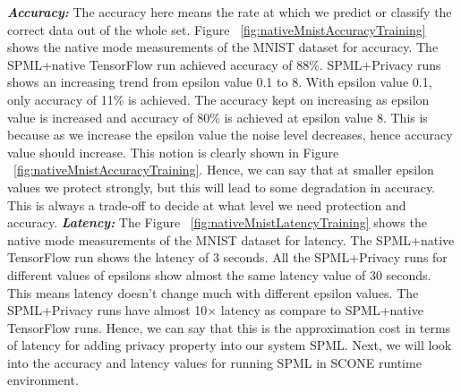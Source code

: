 \textbf{\textit{Accuracy: }}The accuracy here means the rate at which we predict or classify the correct data out of the whole set. Figure ~\ref{fig:nativeMnistAccuracyTraining} shows the native mode measurements of the MNIST dataset for accuracy. The SPML+native TensorFlow run achieved accuracy of 88\%. SPML+Privacy runs shows an increasing trend from epsilon value 0.1 to 8. With epsilon value 0.1, only accuracy of 11\% is achieved. The accuracy kept on increasing as epsilon value is increased and accuracy of 80\% is achieved at epsilon value 8. This is because as we increase the epsilon value the noise level decreases, hence accuracy value should increase. This notion is clearly shown in Figure ~\ref{fig:nativeMnistAccuracyTraining}. Hence, we can say that at smaller epsilon values we protect strongly, but this will lead to some degradation in accuracy. This is always a trade-off to decide at what level we need protection and accuracy.
\newline
\newline
\textbf{\textit{Latency: }}The Figure ~\ref{fig:nativeMnistLatencyTraining} shows the native mode measurements of the MNIST dataset for latency. The SPML+native TensorFlow run shows the latency of 3 seconds. All the SPML+Privacy runs for different values of epsilons show almost the same latency value of 30 seconds. This means latency doesn't change much with different epsilon values. The SPML+Privacy runs have almost 10$\times$ latency as compare to SPML+native TensorFlow runs. Hence, we can say that this is the approximation cost in terms of latency for adding privacy property into our system SPML. Next, we will look into the accuracy and latency values for running SPML in SCONE runtime environment.



